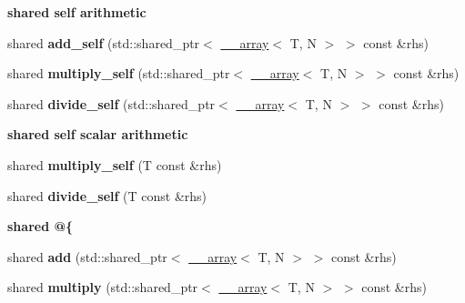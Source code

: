 \begin{Indent}{\bf shared self arithmetic}\par
{\em \label{_amgrp0ebedd0318bf343b5e17c1deddd1521f}
 }\begin{DoxyCompactItemize}
\item 
\hypertarget{class____array_ab98796270b9e65a78d5d9eda70c66ef9}{
shared {\bfseries add\_\-self} (std::shared\_\-ptr$<$ \hyperlink{class____array}{\_\-\_\-array}$<$ T, N $>$ $>$ const \&rhs)}
\label{class____array_ab98796270b9e65a78d5d9eda70c66ef9}

\item 
\hypertarget{class____array_a34920f8760f31932fa0b7134ad852fe3}{
shared {\bfseries multiply\_\-self} (std::shared\_\-ptr$<$ \hyperlink{class____array}{\_\-\_\-array}$<$ T, N $>$ $>$ const \&rhs)}
\label{class____array_a34920f8760f31932fa0b7134ad852fe3}

\item 
\hypertarget{class____array_a99892174a079f472bcd3f95621e5b18e}{
shared {\bfseries divide\_\-self} (std::shared\_\-ptr$<$ \hyperlink{class____array}{\_\-\_\-array}$<$ T, N $>$ $>$ const \&rhs)}
\label{class____array_a99892174a079f472bcd3f95621e5b18e}

\end{DoxyCompactItemize}
\end{Indent}
\begin{Indent}{\bf shared self scalar arithmetic}\par
{\em \label{_amgrp39886a4931184ad2091cad99cafe00de}
 }\begin{DoxyCompactItemize}
\item 
\hypertarget{class____array_a87ee1d56dc650d1cc15fc4a17e29a2ff}{
shared {\bfseries multiply\_\-self} (T const \&rhs)}
\label{class____array_a87ee1d56dc650d1cc15fc4a17e29a2ff}

\item 
\hypertarget{class____array_a082fa2c88f43930d0138e9ccd383e59b}{
shared {\bfseries divide\_\-self} (T const \&rhs)}
\label{class____array_a082fa2c88f43930d0138e9ccd383e59b}

\end{DoxyCompactItemize}
\end{Indent}
\begin{Indent}{\bf shared @\{}\par
{\em \label{_amgrpd7747f34a02ed4bfc358438fccf29bd2}
 }\begin{DoxyCompactItemize}
\item 
\hypertarget{class____array_ab20b7f53c81ac31b349d31bc58e650f6}{
shared {\bfseries add} (std::shared\_\-ptr$<$ \hyperlink{class____array}{\_\-\_\-array}$<$ T, N $>$ $>$ const \&rhs)}
\label{class____array_ab20b7f53c81ac31b349d31bc58e650f6}

\item 
\hypertarget{class____array_a35d7cfec43ce9f395f148b64a6083a69}{
shared {\bfseries multiply} (std::shared\_\-ptr$<$ \hyperlink{class____array}{\_\-\_\-array}$<$ T, N $>$ $>$ const \&rhs)}
\label{class____array_a35d7cfec43ce9f395f148b64a6083a69}

\end{DoxyCompactItemize}
\end{Indent}
